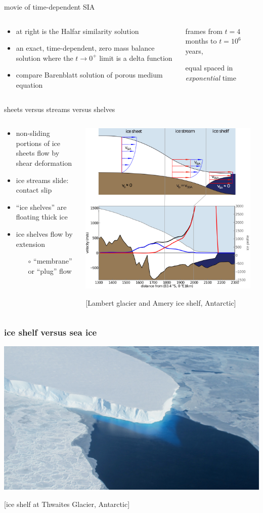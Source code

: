 \documentclass[hide notes,intlimits]{beamer}
\newcommand{\contactslipslide}{
\begin{frame}{sheets versus streams versus shelves}

\begin{columns}
\begin{column}{0.35\textwidth}
\small
\begin{itemize}
\small
\item non-sliding portions of ice sheets flow by shear deformation
\item ice streams slide: \alert{contact slip}
\item ``ice shelves'' are floating thick ice
\item ice shelves flow by extension
  \begin{itemize}
  \scriptsize
  \item[$\circ$] ``membrane'' or ``plug'' flow
  \end{itemize}
\end{itemize}
\end{column}

\begin{column}{0.65\textwidth}

\hfill\includegraphics[width=0.95\textwidth]{siassacartoon-lambert}

\begin{center}
\vspace{-0.18in}
\tiny [Lambert glacier and Amery ice shelf, Antarctic]
\end{center}
\end{column}
\end{columns}
\end{frame}
}
\begin{document}
\begin{frame}{movie of time-dependent SIA}

\begin{columns}
\begin{column}{0.4\textwidth}
\small
\begin{itemize}
\item at right is the Halfar similarity solution
\item an exact, time-dependent, zero mass balance solution where the $t\to 0^+$ limit is a delta function
\item compare Barenblatt solution of porous medium equation
\end{itemize}
\end{column}

\begin{column}{0.65\textwidth}
\vspace{-0.25in}

\begin{center}

\bigskip
\tiny
frames from $t=4$ months to $t = 10^6$ years,

equal spaced in \emph{exponential} time
\end{center}
\end{column}
\end{columns}
\end{frame}


\contactslipslide


\begin{frame}
  \frametitle{ice shelf versus sea ice}

\begin{center}
\vspace{-0.2in}

\includegraphics[width=1.0\textwidth]{supp4rignot-small}

\medskip
\tiny [ice shelf at Thwaites Glacier, Antarctic]
\end{center}
\end{frame}
\end{document}
